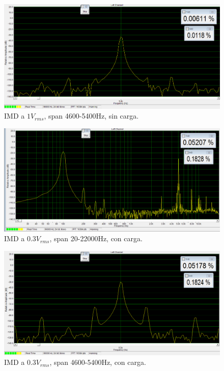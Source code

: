 \begin{figure}[H]
\centering
\includegraphics[width=\textwidth]{img/Distorsion/IMD_1V_4600_5400.png}
\caption{IMD a $1V_{rms}$, span 4600-5400Hz, sin carga.}
\label{IMD4} 
\end{figure}

\begin{figure}[H]
\centering
\includegraphics[width=\textwidth]{img/Distorsion/IMD_03V_0_22k_carga.png}
\caption{IMD a $0.3V_{rms}$, span 20-22000Hz, con carga.}
\label{IMD5} 
\end{figure}

\begin{figure}[H]
\centering
\includegraphics[width=\textwidth]{img/Distorsion/IMD_03V_4600_5400_carga.png}
\caption{IMD a $0.3V_{rms}$, span 4600-5400Hz, con carga.}
\label{IMD6} 
\end{figure}

